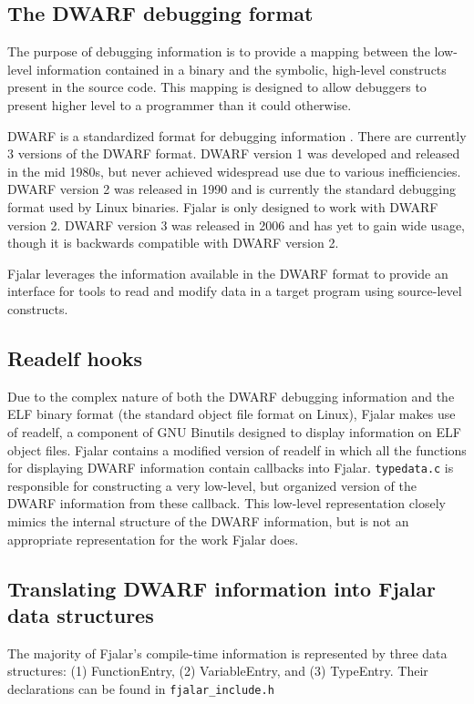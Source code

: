 \documentclass{article}
\begin{document}
\subsection{The DWARF debugging format}
The purpose of debugging information is to provide a mapping between
the low-level information contained in a binary and the symbolic,
high-level constructs present in the source code. This mapping is
designed to allow debuggers to present higher level to a programmer
than it could otherwise.

DWARF is a standardized format for debugging information
\cite{silverstein1993dwarf}. There are currently 3 versions of the
DWARF format. DWARF version 1 was developed and released in the mid
1980s, but never achieved widespread use due to various inefficiencies. DWARF
version 2 was released in 1990 and is currently the standard debugging
format used by Linux binaries. Fjalar is only designed to work with
DWARF version 2. DWARF version 3 was released in 2006 and has yet to
gain wide usage, though it is backwards compatible with DWARF version 2.

Fjalar leverages the information available in the DWARF format to
provide an interface for tools to read and modify data in a target
program using source-level constructs.


\subsection{Readelf hooks}
Due to the complex nature of both the DWARF debugging information and
the ELF binary format (the standard object file format on Linux),
Fjalar makes use of readelf, a component of GNU Binutils designed to
display information on ELF object files. Fjalar contains a modified
version of readelf in which all the functions for displaying DWARF
information contain callbacks into Fjalar. \texttt{typedata.c} is
responsible for constructing a very low-level, but organized version
of the DWARF information from these callback. This low-level 
representation closely mimics the internal structure of the DWARF
information, but is not an appropriate representation for the work
Fjalar does.

\subsection{Translating DWARF information into Fjalar data structures}
The majority of Fjalar's compile-time information is represented by
three data structures: (1) FunctionEntry, (2) VariableEntry, and (3)
TypeEntry. Their declarations can be found in \texttt{fjalar\_include.h}
\end{document}
